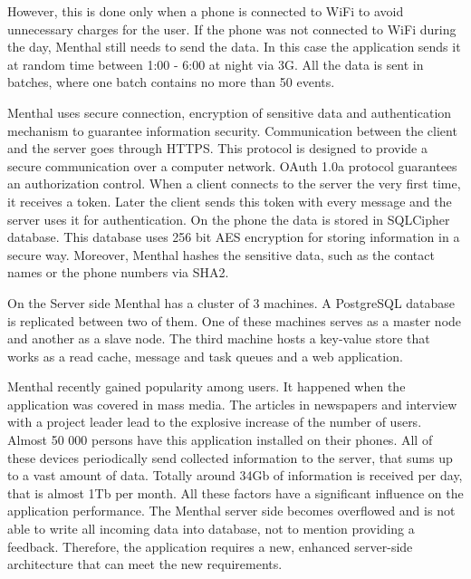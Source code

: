 However, this is done only when a phone is connected to WiFi to avoid unnecessary charges for the user.
If the phone was not connected to WiFi during the day, Menthal still needs to send the data.
In this case the application sends it at random time between 1:00 - 6:00 at night via 3G.
All the data is sent in batches, where one batch contains no more than 50 events.

Menthal uses secure connection, encryption of sensitive data and authentication mechanism to guarantee information security.
Communication between the client and the server goes through HTTPS.
This protocol is designed to provide a secure communication over a computer network. 
OAuth 1.0a protocol guarantees an authorization control.
When a client connects to the server the very first time, it receives a token.
Later the client sends this token with every message and the server uses it for authentication.
On the phone the data is stored in SQLCipher database.
This database uses 256 bit AES encryption for storing information in a secure way.
Moreover, Menthal hashes the sensitive data, such as the contact names or the phone numbers via SHA2. 

On the Server side Menthal has a cluster of 3 machines.
A PostgreSQL database is replicated between two of them.
One of these machines serves as a master node and another as a slave node.
The third machine hosts a key-value store that works as a read cache, message and task queues and a web application.
 
Menthal recently gained popularity among users.
It happened when the application was covered in mass media.
The articles in newspapers and interview with a project leader lead to the explosive increase of the number of users.
Almost 50 000 persons have this application installed on their phones.
All of these devices periodically send collected information to the server, that sums up to a vast amount of data.
Totally around 34Gb of information is received per day, that is almost 1Tb per month.
All these factors have a significant influence on the application performance.
The Menthal server side becomes overflowed and is not able to write all incoming data into database, not to mention providing a feedback.
Therefore, the application requires a new, enhanced server-side architecture that can meet the new requirements.